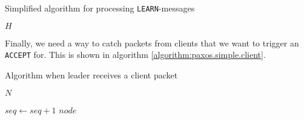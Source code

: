 \begin{algorithm}[H]
  \caption{Simplified algorithm for processing \texttt{LEARN}-messages}
  \label{algorithm:paxos.simple.learner}
  \begin{algorithmic}
    \State $H$ 
    \State

          \State {}
        \EndForIn
      \EndIf
    \EndOn
  \end{algorithmic}
\end{algorithm}

Finally, we need a way to catch packets from clients that we want to trigger
an \texttt{ACCEPT} for.  This is shown in algorithm
\ref{algorithm:paxos.simple.client}.

\begin{algorithm}[H]
  \caption{Algorithm when leader receives a client packet}
  \label{algorithm:paxos.simple.client}
  \begin{algorithmic}
    \State $N$
    \State

      \State $seq \gets seq + 1$ 
        \State {}
                      {$node$}
      \EndForIn
    \EndOn
  \end{algorithmic}
\end{algorithm}

